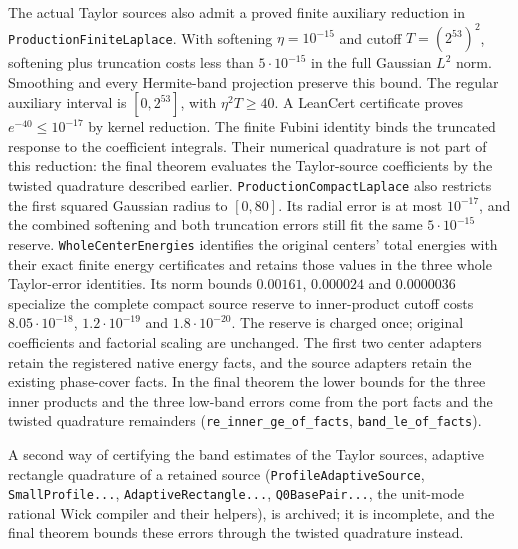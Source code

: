 \documentclass[11pt,a4paper]{article}
\newcommand{\lean}[1]{\texttt{\small #1}}
\begin{document}
The actual Taylor sources also admit a proved finite auxiliary reduction in
\texttt{ProductionFiniteLaplace}. With softening $\eta=10^{-15}$ and cutoff
$T=(2^{53})^2$, softening plus truncation costs less than $5\cdot10^{-15}$
in the full Gaussian $L^2$ norm. Smoothing and every Hermite-band projection
preserve this bound. The regular auxiliary interval is $[0,2^{53}]$, with
$\eta^2T\ge40$. A LeanCert certificate proves $e^{-40}\le10^{-17}$ by
kernel reduction. The finite Fubini identity binds the truncated response to
the coefficient integrals. Their numerical quadrature is not part of this
reduction: the final theorem evaluates the Taylor-source coefficients by the
twisted quadrature described earlier.
\texttt{ProductionCompactLaplace} also restricts the first squared Gaussian
radius to $[0,80]$. Its radial error is at most $10^{-17}$, and the combined
softening and both truncation errors still fit the same $5\cdot10^{-15}$ reserve.
\texttt{WholeCenterEnergies} identifies the original centers' total energies
with their exact finite energy certificates and retains those values in the
three whole Taylor-error identities. Its norm bounds $0.00161$, $0.000024$ and
$0.0000036$ specialize the complete compact source reserve to inner-product
cutoff costs $8.05\cdot10^{-18}$, $1.2\cdot10^{-19}$ and $1.8\cdot10^{-20}$.
The reserve is charged once; original coefficients and factorial scaling are
unchanged. The first two center adapters retain the registered native energy
facts, and the source adapters retain the existing phase-cover facts.
In the final theorem the lower bounds for the three inner products and the
three low-band errors come from the port facts and the twisted quadrature
remainders (\lean{re\_inner\_ge\_of\_facts}, \lean{band\_le\_of\_facts}).

\begin{sloppypar}
A second way of certifying the band estimates of the Taylor sources, adaptive
rectangle quadrature of a retained source (\lean{ProfileAdaptiveSource},
\lean{SmallProfile...}, \lean{AdaptiveRectangle...}, \lean{Q0BasePair...}, the
unit-mode rational Wick compiler and their helpers), is archived; it is
incomplete, and the final theorem bounds these errors through the twisted
quadrature instead.
\end{sloppypar}
\end{document}
